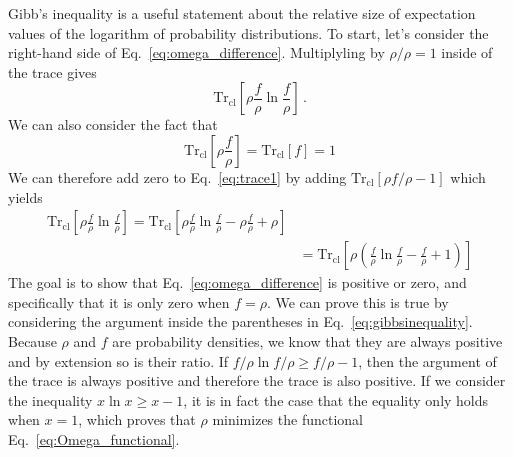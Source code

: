 \documentclass{report}
\newcommand{\trace}{\operatorname{Tr_{cl}}}
\begin{document}
Gibb's inequality is a useful statement about the relative size of expectation values of the logarithm of probability distributions. To start, let's consider the right-hand side of Eq.~\ref{eq:omega_difference}.
Multiplyling by \(\rho/\rho = 1 \) inside of the trace gives
\begin{equation}
    \trace \left[\rho\frac{f}{\rho}\ln\frac{f}{\rho}\right] \, .
    \label{eq:trace1}
\end{equation}
We can also consider the fact that
\begin{equation}
    \trace \left[\rho \frac{f}{\rho}\right] = \trace\left[f\right] = 1
\end{equation}
We can therefore add zero to Eq.~\ref{eq:trace1} by adding \(\trace[\rho f/\rho - 1]\) which yields
\begin{equation}
    \begin{split}
    \trace \left[\rho\frac{f}{\rho}\ln\frac{f}{\rho}\right] = \trace \left[\rho\frac{f}{\rho}\ln\frac{f}{\rho} - \rho \frac{f}{\rho} + \rho\right] \\
    &= \trace\left[\rho\left(\frac{f}{\rho}\ln\frac{f}{\rho} - \frac{f}{\rho} + 1\right)\right]
    \end{split}
    \label{eq:gibbsinequality}
\end{equation}
The goal is to show that Eq.~\ref{eq:omega_difference} is positive or zero, and specifically that it is only zero when \( f=\rho \). We can prove this is true by considering the argument inside the parentheses in Eq.~\ref{eq:gibbsinequality}. Because \( \rho \) and \( f \) are probability densities, we know that they are always positive and by extension so is their ratio. If \(f/\rho \ln f/\rho \geq f/\rho - 1 \), then the argument of the trace is always positive and therefore the trace is also positive. If we consider the inequality \( x\ln x \geq x - 1 \), it is in fact the case that the equality only holds when \( x=1 \), which proves that \(\rho \) minimizes the functional Eq.~\ref{eq:Omega_functional}.
\end{document}
